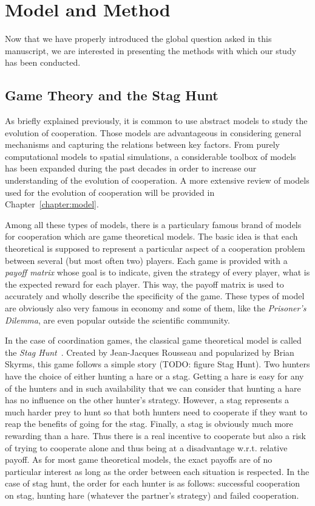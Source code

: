 


\section{Model and Method}

  Now that we have properly introduced the global question asked in this manuscript, we are interested in presenting the methods with which our study has been conducted.
  
  \subsection{Game Theory and the Stag Hunt}

    As briefly explained previously, it is common to use abstract models to study the evolution of cooperation. Those models are advantageous in considering general mechanisms and capturing the relations between key factors. From purely computational models to spatial simulations, a considerable toolbox of models has been expanded during the past decades in order to increase our understanding of the evolution of cooperation. A more extensive review of models used for the evolution of cooperation will be provided in Chapter~\ref{chapter:model}.

    Among all these types of models, there is a particulary famous brand of models for cooperation which are game theoretical models. The basic idea is that each theoretical is supposed to represent a particular aspect of a cooperation problem between several (but most often two) players. Each game is provided with a \emph{payoff matrix} whose goal is to indicate, given the strategy of every player, what is the expected reward for each player. This way, the payoff matrix is used to accurately and wholly describe the specificity of the game. These types of model are obviously also very famous in economy and some of them, like the \emph{Prisoner's Dilemma}, are even popular outside the scientific community.

    In the case of coordination games, the classical game theoretical model is called the \emph{Stag Hunt}~\parencite{Skyrms2004}. Created by Jean-Jacques Rousseau and popularized by Brian Skyrms, this game follows a simple story (TODO: figure Stag Hunt). Two hunters have the choice of either hunting a hare or a stag. Getting a hare is easy for any of the hunters and in such availability that we can consider that hunting a hare has no influence on the other hunter's strategy. However, a stag represents a much harder prey to hunt so that both hunters need to cooperate if they want to reap the benefits of going for the stag. Finally, a stag is obviously much more rewarding than a hare. Thus there is a real incentive to cooperate but also a risk of trying to cooperate alone and thus being at a disadvantage w.r.t. relative payoff. As for most game theoretical models, the exact payoffs are of no particular interest as long as the order between each situation is respected. In the case of stag hunt, the order for each hunter is as follows: successful cooperation on stag, hunting hare (whatever the partner's strategy) and failed cooperation.

